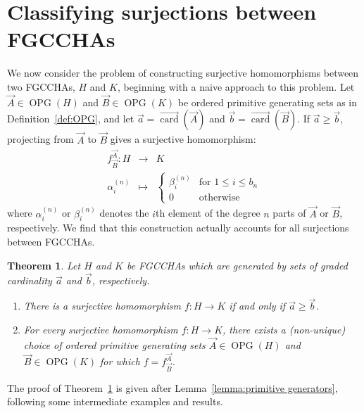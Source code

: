 \documentclass[11pt]{amsart}
\newtheorem{theorem}{Theorem}[section]
\theoremstyle{definition}
\numberwithin{equation}{section}
\newcommand{\FGCCHAs}{\textsf{FGCCHA}s\xspace}
\newcommand{\veccard}{\overrightarrow{\operatorname{card}}}
\newcommand{\OPG}{\operatorname{OPG}}
\begin{document}
\section{Classifying surjections between \FGCCHAs}
\label{sec:surjection}
We now consider the problem of constructing surjective homomorphisms between two \FGCCHAs, $H$ and $K$, beginning with a naive approach to this problem.  
Let $\vec{A} \in \OPG(H)$ and $\vec{B} \in \OPG(K)$ be ordered primitive generating sets as in Definition~\ref{def:OPG}, and let $\vec{a} = \veccard(\vec{A})$ and $\vec{b} = \veccard(\vec{B})$. 
If $\vec{a} \ge \vec{b}$, projecting from $\vec{A}$ to $\vec{B}$ gives a surjective homomorphism:
\begin{equation}
\label{eq:defaultsurjection}
\begin{array}{rcl}
f^{\vec{A}}_{\vec{B}}: H & \to & K \\[1ex]
\alpha^{(n)}_{i} & \mapsto & \begin{cases}
\beta^{(n)}_{i} & \text{for $1 \le i \le b_{n}$} \\
0 & \text{otherwise}
\end{cases}
\end{array}
\end{equation}
where $\alpha^{(n)}_{i}$ or $\beta^{(n)}_{i}$ denotes the
$i$th element of the degree $n$ parts of $\vec{A}$ or $\vec{B}$, respectively.  
We find that this construction actually accounts for all surjections between \FGCCHAs.

\begin{theorem}
\label{thm:surjection}
Let $H$ and $K$ be \FGCCHAs which are generated by sets of graded cardinality $\vec{a}$ and $\vec{b}$, respectively.  
\begin{enumerate}
\item There is a surjective homomorphism $f: H \to K$ if and only if $\vec{a} \ge \vec{b}$.

\item For every surjective homomorphism $f: H \to K$, there exists a (non-unique) choice of
ordered primitive generating sets $\vec{A} \in \OPG(H)$ and $\vec{B} \in \OPG(K)$
for which $f = f^{\vec{A}}_{\vec{B}}$.

\end{enumerate}
\end{theorem}

The proof of Theorem~\ref{thm:surjection} is given after Lemma~\ref{lemma:primitive generators}, following some intermediate examples and results.
\end{document}
